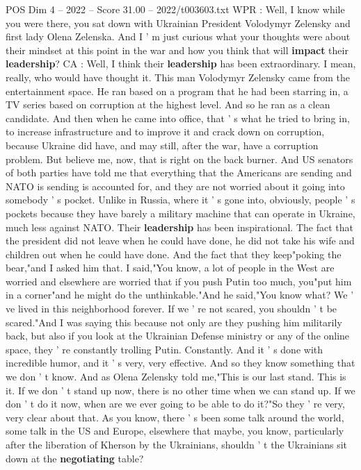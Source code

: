 \begin{textsample}{POS Dim 4 – 2022 – Score 31.00 – 2022/t003603.txt}
WPR : Well, I know while you were there, you sat down with Ukrainian President Volodymyr Zelensky and first lady Olena Zelenska.
And I ' m just curious what your thoughts were about their mindset at this point in the war and how you think that will \textbf{impact} their \textbf{leadership}?
CA : Well, I think their \textbf{leadership} has been extraordinary.
I mean, really, who would have thought it.
This man Volodymyr Zelensky came from the entertainment space.
He ran based on a program that he had been starring in, a TV series based on corruption at the highest level.
And so he ran as a clean candidate.
And then when he came into office, that ' s what he tried to bring in, to increase infrastructure and to improve it and crack down on corruption, because Ukraine did have, and may still, after the war, have a corruption problem.
But believe me, now, that is right on the back burner.
And US senators of both parties have told me that everything that the Americans are sending and NATO is sending is accounted for, and they are not worried about it going into somebody ' s pocket.
Unlike in Russia, where it ' s gone into, obviously, people ' s pockets because they have barely a military machine that can operate in Ukraine, much less against NATO.
Their \textbf{leadership} has been inspirational.
The fact that the president did not leave when he could have done, he did not take his wife and children out when he could have done.
And the fact that they keep"poking the bear,"and I asked him that.
I said,"You know, a lot of people in the West are worried and elsewhere are worried that if you push Putin too much, you"put him in a corner"and he might do the unthinkable."And he said,"You know what?
We ' ve lived in this neighborhood forever.
If we ' re not scared, you shouldn ' t be scared."And I was saying this because not only are they pushing him militarily back, but also if you look at the Ukrainian Defense ministry or any of the online space, they ' re constantly trolling Putin.
Constantly.
And it ' s done with incredible humor, and it ' s very, very effective.
And so they know something that we don ' t know.
And as Olena Zelensky told me,"This is our last stand.
This is it.
If we don ' t stand up now, there is no other time when we can stand up.
If we don ' t do it now, when are we ever going to be able to do it?"So they ' re very, very clear about that.
As you know, there ' s been some talk around the world, some talk in the US and Europe, elsewhere that maybe, you know, particularly after the liberation of Kherson by the Ukrainians, shouldn ' t the Ukrainians sit down at the \textbf{negotiating} table?

\end{textsample}
